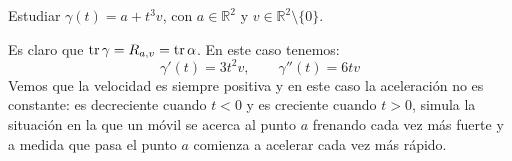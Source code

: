 \begin{ejercicio} 
    Estudiar $\gamma(t) = a+t^3 v$, con $a\in \mathbb{R}^2$ y $v\in \mathbb{R}^2\setminus \{0\}$.

    \noindent
    Es claro que $\operatorname{tr} \gamma = R_{a,v} = \operatorname{tr} \alpha$. En este caso tenemos:
    \begin{equation*}
        \gamma'(t) = 3t^2v, \qquad \gamma''(t) = 6tv
    \end{equation*}
    Vemos que la velocidad es siempre positiva y en este caso la aceleración no es constante: es decreciente cuando $t<0$ y es creciente cuando $t>0$, simula la situación en la que un móvil se acerca al punto $a$ frenando cada vez más fuerte y a medida que pasa el punto $a$ comienza a acelerar cada vez más rápido.
\end{ejercicio}

